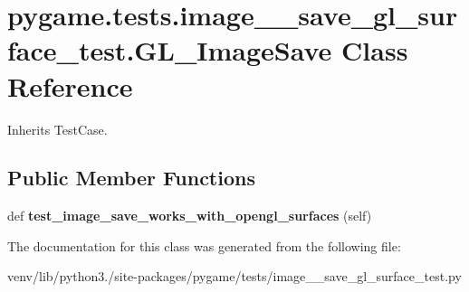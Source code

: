 \hypertarget{classpygame_1_1tests_1_1image____save__gl__surface__test_1_1_g_l___image_save}{}\section{pygame.\+tests.\+image\+\_\+\+\_\+save\+\_\+gl\+\_\+surface\+\_\+test.\+G\+L\+\_\+\+Image\+Save Class Reference}
\label{classpygame_1_1tests_1_1image____save__gl__surface__test_1_1_g_l___image_save}


Inherits Test\+Case.

\subsection*{Public Member Functions}
\begin{DoxyCompactItemize}
\item 
\mbox{\label{classpygame_1_1tests_1_1image____save__gl__surface__test_1_1_g_l___image_save_a731289273d242374e7e71206837f82f4}} 
def {\bfseries test\+\_\+image\+\_\+save\+\_\+works\+\_\+with\+\_\+opengl\+\_\+surfaces} (self)
\end{DoxyCompactItemize}


The documentation for this class was generated from the following file\+:\begin{DoxyCompactItemize}
\item 
venv/lib/python3./site-\/packages/pygame/tests/image\+\_\+\+\_\+save\+\_\+gl\+\_\+surface\+\_\+test.\+py\end{DoxyCompactItemize}
